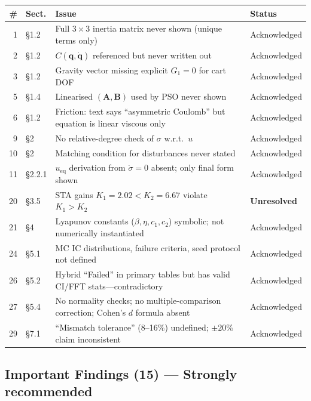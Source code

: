 \documentclass[10pt, a4paper]{article}
\newcommand{\statU}{\textbf{\textcolor{blocked}{Unresolved}}}
\newcommand{\statA}{\textcolor{headblue}{Acknowledged}}
\begin{document}
\begin{center}
\small
\begin{tabularx}{\columnwidth}{@{}rp{0.85cm}Xp{1.85cm}@{}}
\toprule
\textbf{\#} & \textbf{Sect.} & \textbf{Issue} & \textbf{Status} \\
\midrule
1  & \S1.2   & Full $3{\times}3$ inertia matrix never shown (unique terms only) & \statA \\
2  & \S1.2   & $C(\mathbf{q},\dot{\mathbf{q}})$ referenced but never written out & \statA \\
3  & \S1.2   & Gravity vector missing explicit $G_1{=}0$ for cart DOF & \statA \\
5  & \S1.4   & Linearised $(\mathbf{A},\mathbf{B})$ used by PSO never shown & \statA \\
6  & \S1.2   & Friction: text says ``asymmetric Coulomb'' but equation is linear viscous only & \statA \\
9  & \S2     & No relative-degree check of $\sigma$ w.r.t.\ $u$ & \statA \\
10 & \S2     & Matching condition for disturbances never stated & \statA \\
11 & \S2.2.1 & $u_\text{eq}$ derivation from $\dot{\sigma}{=}0$ absent; only final form shown & \statA \\
20 & \S3.5   & STA gains $K_1{=}2.02 < K_2{=}6.67$ violate $K_1{>}K_2$ & \statU \\
21 & \S4     & Lyapunov constants ($\beta,\eta,c_1,c_2$) symbolic; not numerically instantiated & \statA \\
24 & \S5.1   & MC IC distributions, failure criteria, seed protocol not defined & \statA \\
26 & \S5.2   & Hybrid ``Failed'' in primary tables but has valid CI/FFT stats---contradictory & \statA \\
27 & \S5.4   & No normality checks; no multiple-comparison correction; Cohen's $d$ formula absent & \statA \\
29 & \S7.1   & ``Mismatch tolerance'' (8--16\%) undefined; ${\pm}20\%$ claim inconsistent & \statA \\
\bottomrule
\end{tabularx}
\end{center}

\subsection*{\textcolor{pending}{Important Findings (15) --- Strongly recommended}}
\end{document}
